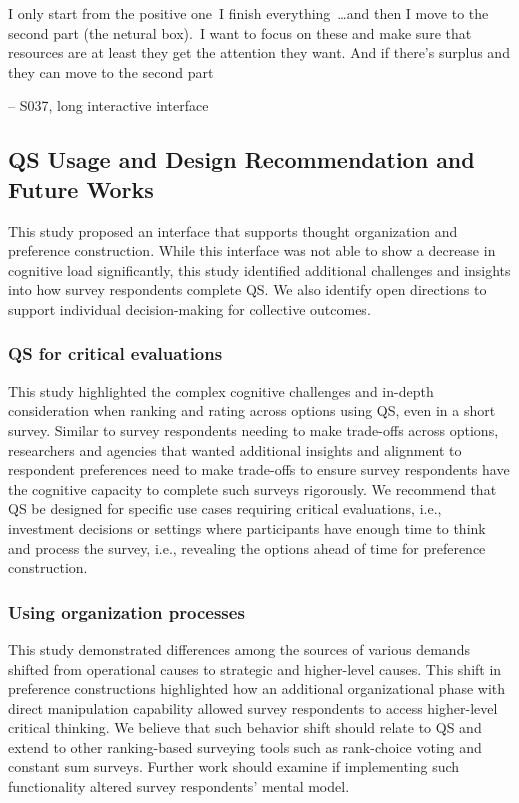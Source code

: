 \begin{displayquote}
I only start from the positive one~\bracketellipsis I finish everything~\ldots and then I move to the second part (the netural box).~\bracketellipsis I want to focus on these and make sure that resources are at least they get the attention they want. And if there's surplus and they can move to the second part

\noindent \hfill -- S037, long interactive interface
\end{displayquote}

\subsection{QS Usage and Design Recommendation and Future Works}
This study proposed an interface that supports thought organization and preference construction. While this interface was not able to show a decrease in cognitive load significantly, this study identified additional challenges and insights into how survey respondents complete QS. We also identify open directions to support individual decision-making for collective outcomes.

\subsubsection{QS for critical evaluations}
This study highlighted the complex cognitive challenges and in-depth consideration when ranking and rating across options using QS, even in a short survey. Similar to survey respondents needing to make trade-offs across options, researchers and agencies that wanted additional insights and alignment to respondent preferences need to make trade-offs to ensure survey respondents have the cognitive capacity to complete such surveys rigorously. We recommend that QS be designed for specific use cases requiring critical evaluations, i.e., investment decisions or settings where participants have enough time to think and process the survey, i.e., revealing the options ahead of time for preference construction.

\subsubsection{Using organization processes}
This study demonstrated differences among the sources of various demands shifted from operational causes to strategic and higher-level causes. This shift in preference constructions highlighted how an additional organizational phase with direct manipulation capability allowed survey respondents to access higher-level critical thinking. We believe that such behavior shift should relate to QS and extend to other ranking-based surveying tools such as rank-choice voting and constant sum surveys. Further work should examine if implementing such functionality altered survey respondents' mental model.

